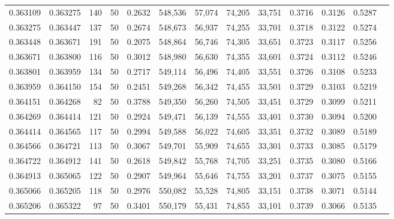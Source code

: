 \begin{tabular}{rrrrrrrrrrrrr}
0.363109 & 0.363275 &   140 &  50 &                                     0.2632 & 548,536 &  57,074 &  74,205 &  33,751 & 0.3716 & 0.3126 & 0.5287 \\
0.363275 & 0.363447 &   137 &  50 &                                     0.2674 & 548,673 &  56,937 &  74,255 &  33,701 & 0.3718 & 0.3122 & 0.5274 \\
0.363448 & 0.363671 &   191 &  50 &                                     0.2075 & 548,864 &  56,746 &  74,305 &  33,651 & 0.3723 & 0.3117 & 0.5256 \\
0.363671 & 0.363800 &   116 &  50 &                                     0.3012 & 548,980 &  56,630 &  74,355 &  33,601 & 0.3724 & 0.3112 & 0.5246 \\
0.363801 & 0.363959 &   134 &  50 &                                     0.2717 & 549,114 &  56,496 &  74,405 &  33,551 & 0.3726 & 0.3108 & 0.5233 \\
0.363959 & 0.364150 &   154 &  50 &                                     0.2451 & 549,268 &  56,342 &  74,455 &  33,501 & 0.3729 & 0.3103 & 0.5219 \\
0.364151 & 0.364268 &    82 &  50 &                                     0.3788 & 549,350 &  56,260 &  74,505 &  33,451 & 0.3729 & 0.3099 & 0.5211 \\
0.364269 & 0.364414 &   121 &  50 &                                     0.2924 & 549,471 &  56,139 &  74,555 &  33,401 & 0.3730 & 0.3094 & 0.5200 \\
0.364414 & 0.364565 &   117 &  50 &                                     0.2994 & 549,588 &  56,022 &  74,605 &  33,351 & 0.3732 & 0.3089 & 0.5189 \\
0.364566 & 0.364721 &   113 &  50 &                                     0.3067 & 549,701 &  55,909 &  74,655 &  33,301 & 0.3733 & 0.3085 & 0.5179 \\
0.364722 & 0.364912 &   141 &  50 &                                     0.2618 & 549,842 &  55,768 &  74,705 &  33,251 & 0.3735 & 0.3080 & 0.5166 \\
0.364913 & 0.365065 &   122 &  50 &                                     0.2907 & 549,964 &  55,646 &  74,755 &  33,201 & 0.3737 & 0.3075 & 0.5155 \\
0.365066 & 0.365205 &   118 &  50 &                                     0.2976 & 550,082 &  55,528 &  74,805 &  33,151 & 0.3738 & 0.3071 & 0.5144 \\
0.365206 & 0.365322 &    97 &  50 &                                     0.3401 & 550,179 &  55,431 &  74,855 &  33,101 & 0.3739 & 0.3066 & 0.5135 \\

\end{tabular}
